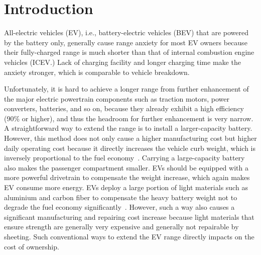 \documentclass{IEEEtran}
\begin{document}
\section{Introduction}

All-electric vehicles (EV), i.e., battery-electric vehicles (BEV) that are powered by the battery only, generally cause range anxiety for most EV owners because their fully-charged range is much shorter than that of internal combustion engine vehicles (ICEV.) Lack of charging facility and longer charging time make the anxiety stronger, which is comparable to vehicle breakdown.

Unfortunately, it is hard to achieve a longer range from further enhancement of the major electric powertrain components such as traction motors, power converters, batteries, and so on, because they already exhibit a high efficiency (90\% or higher), and thus the headroom for further enhancement is very narrow.
A straightforward way to extend the range is to install a larger-capacity battery. However, this method does not only cause a higher manufacturing cost but higher daily operating cost because it  directly increases the vehicle curb weight, which is inversely proportional to the fuel economy~\cite{Hong:ASPDAC16}. Carrying a large-capacity battery also makes the passenger compartment smaller.
EVs should be equipped with a more powerful drivetrain to compensate the weight increase, which again makes EV consume more energy. 
EVs deploy a large portion of light materials such as aluminium and carbon fiber to compensate the heavy battery weight not to degrade the fuel economy significantly~\cite{Chang:ICCAD14}. However, such a way also causes a significant manufacturing and repairing cost increase because light materials that ensure strength are generally very expensive and generally not repairable by sheeting. Such conventional ways to extend the EV range directly impacts on the cost of ownership.
\end{document}
